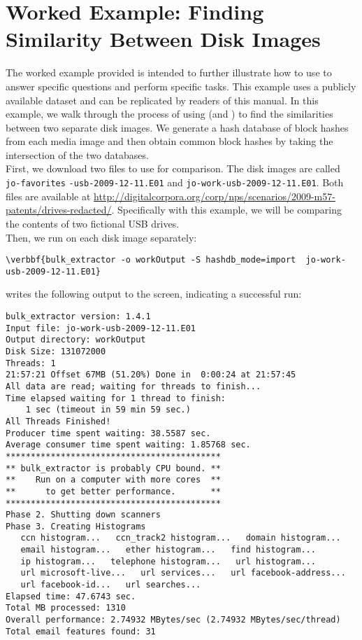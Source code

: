
\section{Worked Example: Finding Similarity Between Disk Images}
The worked example provided is intended to further illustrate how to use \hash to answer specific questions and perform specific tasks.  This example uses a publicly available dataset and can be replicated by readers of this manual.  In this example, we walk through the process of using \hash (and \bulk) to find the similarities between two separate disk images. We generate a hash database of block hashes from each media image and then obtain common block hashes by taking the intersection of the two databases.\\

First, we download two files to use for comparison. The disk images are called \texttt{jo-favorites} \texttt{-usb-2009-12-11.E01} and \texttt{jo-work-usb-2009-12-11.E01}. Both files are available at \url{http://digitalcorpora.org/corp/nps/scenarios/2009-m57-patents/drives-redacted/}. Specifically with this example, we will be comparing the contents of two fictional USB drives.\\

Then, we run \bulk on each disk image separately:
\begin{Verbatim}[commandchars=\\\{\}]
\verbbf{bulk_extractor -o workOutput -S hashdb_mode=import  jo-work-usb-2009-12-11.E01}
\end{Verbatim}

\bulk writes the following output to the screen, indicating a successful run:
\begingroup
\footnotesize
\begin{Verbatim}[fontfamily=courier]
bulk_extractor version: 1.4.1
Input file: jo-work-usb-2009-12-11.E01
Output directory: workOutput
Disk Size: 131072000
Threads: 1
21:57:21 Offset 67MB (51.20%) Done in  0:00:24 at 21:57:45
All data are read; waiting for threads to finish...
Time elapsed waiting for 1 thread to finish:
    1 sec (timeout in 59 min 59 sec.)
All Threads Finished!
Producer time spent waiting: 38.5587 sec.
Average consumer time spent waiting: 1.85768 sec.
*******************************************
** bulk_extractor is probably CPU bound. **
**    Run on a computer with more cores  **
**      to get better performance.       **
*******************************************
Phase 2. Shutting down scanners
Phase 3. Creating Histograms
   ccn histogram...   ccn_track2 histogram...   domain histogram...
   email histogram...   ether histogram...   find histogram...
   ip histogram...   telephone histogram...   url histogram...
   url microsoft-live...   url services...   url facebook-address...
   url facebook-id...   url searches...
Elapsed time: 47.6743 sec.
Total MB processed: 1310
Overall performance: 2.74932 MBytes/sec (2.74932 MBytes/sec/thread)
Total email features found: 31
\end{Verbatim}
\endgroup


